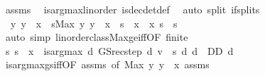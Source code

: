 \begin{isabellebody}
\ assms{\isacharparenleft}{\kern0pt}{}{\isacharparenright}{\kern0pt}\ \isamarkupfalse%
\ is{\isacharunderscore}{\kern0pt}arg{\isacharunderscore}{\kern0pt}max{\isacharunderscore}{\kern0pt}linorder\ is{\isacharunderscore}{\kern0pt}dec{\isacharunderscore}{\kern0pt}det{\isacharunderscore}{\kern0pt}def\ \isamarkupfalse%
\ {\isacharparenleft}{\kern0pt}auto\ split{\isacharcolon}{\kern0pt}\ if{\isacharunderscore}{\kern0pt}splits{\isacharparenright}{\kern0pt}\isanewline
\ \ \isamarkupfalse%
\ {\isacharasterisk}{\kern0pt}{\isacharcolon}{\kern0pt}\ {\isachardoublequoteopen}{\isasymexists}y{\isachardot}{\kern0pt}\ y\ {\isacharless}{\kern0pt}\ x\ {\isasymLongrightarrow}\ s{\isasymle}Max\ {\isacharbraceleft}{\kern0pt}y{\isachardot}{\kern0pt}\ y\ {\isacharless}{\kern0pt}\ x{\isacharbraceright}{\kern0pt}\ {\isasymlongleftrightarrow}\ s\ {\isacharless}{\kern0pt}\ x{\isachardoublequoteclose}\ \ x\ s\ {\isacharcolon}{\kern0pt}{\isacharcolon}{\kern0pt}\ {\isacharprime}{\kern0pt}s\isanewline
\ \ \ \ \isamarkupfalse%
\ {\isacharparenleft}{\kern0pt}auto\ simp{\isacharcolon}{\kern0pt}\ linorder{\isacharunderscore}{\kern0pt}class{\isachardot}{\kern0pt}Max{\isacharunderscore}{\kern0pt}ge{\isacharunderscore}{\kern0pt}iff{\isacharbrackleft}{\kern0pt}OF\ finite{\isacharbrackright}{\kern0pt}{\isacharparenright}{\kern0pt}\isanewline
\ \ \isamarkupfalse%
\ {\isachardoublequoteopen}{\isacharparenleft}{\kern0pt}{\isasymAnd}s{\isachardot}{\kern0pt}\ s\ {\isacharless}{\kern0pt}\ x\ {\isasymLongrightarrow}\ is{\isacharunderscore}{\kern0pt}arg{\isacharunderscore}{\kern0pt}max\ {\isacharparenleft}{\kern0pt}{\isasymlambda}d{\isachardot}{\kern0pt}\ GS{\isacharunderscore}{\kern0pt}rec{\isacharunderscore}{\kern0pt}step\ d\ v\ {\isachardollar}{\kern0pt}\ s{\isacharparenright}{\kern0pt}\ {\isacharparenleft}{\kern0pt}{\isasymlambda}d{\isachardot}{\kern0pt}\ d\ {\isasymin}\ D\isactrlsub D{\isacharparenright}{\kern0pt}\ d{\isacharparenright}{\kern0pt}{\isachardoublequoteclose}\isanewline
\ \ \ \ \isamarkupfalse%
\ is{\isacharunderscore}{\kern0pt}arg{\isacharunderscore}{\kern0pt}max{\isacharunderscore}{\kern0pt}gs{\isacharunderscore}{\kern0pt}iff{\isacharbrackleft}{\kern0pt}OF\ assms{\isacharparenleft}{\kern0pt}{}{\isacharparenright}{\kern0pt}{\isacharcomma}{\kern0pt}\ of\ {\isachardoublequoteopen}Max\ {\isacharbraceleft}{\kern0pt}y{\isachardot}{\kern0pt}\ y\ {\isacharless}{\kern0pt}\ x{\isacharbraceright}{\kern0pt}{\isachardoublequoteclose}{\isacharbrackright}{\kern0pt}\ assms{\isacharparenleft}{\kern0pt}{}{\isacharparenright}{\kern0pt}\isanewline

\end{isabellebody}
